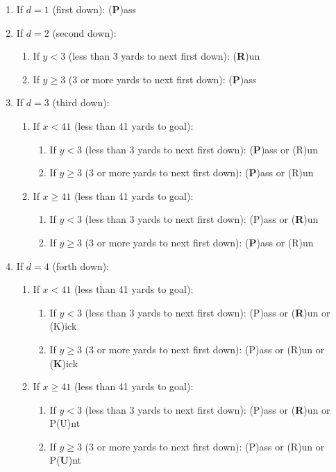 \documentclass[11pt, oneside]{article}   	%
\begin{document}
\begin{enumerate}
\item If $d=1$ (first down): (\textbf{P})ass

\item If $d=2$ (second down): 
\begin{enumerate}
\item If $y<3$ (less than 3 yards to next first down): (\textbf{R})un
\item If $y\geq3$ (3 or more yards to next first down): (\textbf{P})ass
\end{enumerate}

\item If $d=3$ (third down): 
\begin{enumerate}
\item If $x<41$ (less than 41 yards to goal):
\begin{enumerate}
\item If $y<3$ (less than 3 yards to next first down): (\textbf{P})ass or (R)un
\item If $y\geq3$ (3 or more yards to next first down): (\textbf{P})ass or (R)un
\end{enumerate}
\item If $x \geq 41$ (less than 41 yards to goal):
\begin{enumerate}
\item If $y<3$ (less than 3 yards to next first down): (P)ass or (\textbf{R})un
\item If $y\geq3$ (3 or more yards to next first down): (\textbf{P})ass or (R)un
\end{enumerate}
\end{enumerate}

\item If $d=4$ (forth down): 
\begin{enumerate}
\item If $x<41$ (less than 41 yards to goal):
\begin{enumerate}
\item If $y<3$ (less than 3 yards to next first down): (P)ass or (\textbf{R})un or (K)ick
\item If $y\geq3$ (3 or more yards to next first down): (P)ass or (R)un or (\textbf{K})ick
\end{enumerate}
\item If $x \geq 41$ (less than 41 yards to goal):
\begin{enumerate}
\item If $y<3$ (less than 3 yards to next first down): (P)ass or (\textbf{R})un or P(U)nt
\item If $y\geq3$ (3 or more yards to next first down): (P)ass or (R)un or P(\textbf{U})nt
\end{enumerate}
\end{enumerate}

\end{enumerate}
\end{document}
